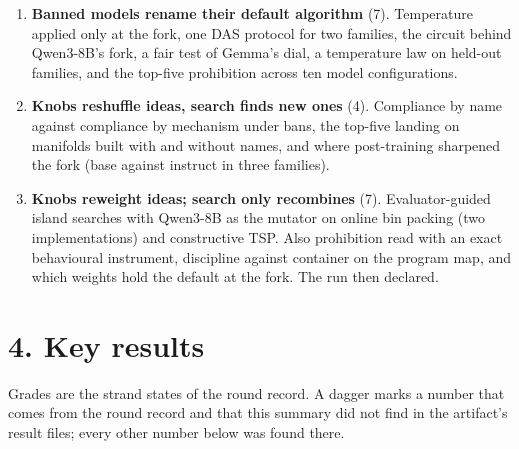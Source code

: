 \documentclass[10pt]{article}
\begin{document}
\begin{enumerate}[label=\textbf{\arabic*.}]
DAS with a circuit in Gemma.
\item \textbf{Banned models rename their default algorithm} (7). Temperature applied only at the fork, one DAS protocol for
two families, the circuit behind Qwen3-8B's fork, a fair test of Gemma's dial, a temperature law on held-out families, and
the top-five prohibition across ten model configurations.
\item \textbf{Knobs reshuffle ideas, search finds new ones} (4). Compliance by name against compliance by mechanism under
bans, the top-five landing on manifolds built with and without names, and where post-training sharpened the fork (base
against instruct in three families).
\item \textbf{Knobs reweight ideas; search only recombines} (7). Evaluator-guided island searches with Qwen3-8B as the mutator
on online bin packing (two implementations) and constructive TSP. Also prohibition read with an exact behavioural instrument,
discipline against container on the program map, and which weights hold the default at the fork. The run then declared.
\end{enumerate}

\section*{4. Key results}

Grades are the strand states of the round record. A dagger marks a number that comes from the round record and that this
summary did not find in the artifact's result files; every other number below was found there.
\end{document}
